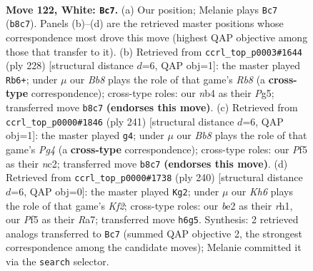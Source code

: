 \documentclass[11pt]{article}
\begin{document}
\clearpage

\begin{figure}[p]\centering
\begin{subfigure}{0.46\textwidth}\centering
\resizebox{\linewidth}{!}{%
\newchessgame
\chessboard[
  setfen={1B4k1/8/7K/5P2/1n6/8/4b3/8 w - - 1 122},
  showmover=false,
  pgfstyle=straightmove, color=movearrow, markmove={b8-c7}
]}
\caption{}
\end{subfigure}\hfill
\begin{subfigure}{0.46\textwidth}\centering
\resizebox{\linewidth}{!}{%
\newchessgame
\chessboard[
  setfen={1R6/5p2/3k4/6P1/4K3/2b5/8/8 w - - 83 115},
  showmover=false,
  pgfstyle=straightmove, color=movearrow, markmove={b8-b6}
]}
\caption{}
\end{subfigure}
\\[4pt]
\begin{subfigure}{0.46\textwidth}\centering
\resizebox{\linewidth}{!}{%
\newchessgame
\chessboard[
  setfen={8/8/b7/4n1p1/8/7k/2NN1K2/8 b - - 9 121},
  showmover=false,
  pgfstyle=straightmove, color=movearrow, markmove={g5-g4}
]}
\caption{}
\end{subfigure}\hfill
\begin{subfigure}{0.46\textwidth}\centering
\resizebox{\linewidth}{!}{%
\newchessgame
\chessboard[
  setfen={5B2/R7/8/5k2/2n5/8/5K2/7r w - - 14 121},
  showmover=false,
  pgfstyle=straightmove, color=movearrow, markmove={f2-g2}
]}
\caption{}
\end{subfigure}
\caption{\textbf{Move 122, White: \texttt{Bc7}.} (a) Our position; Melanie plays \texttt{Bc7} (\texttt{b8c7}). Panels (b)--(d) are the retrieved master positions whose correspondence most drove this move (highest QAP objective among those that transfer to it). (b) Retrieved from \texttt{ccrl\_top\_p0003\#1644} (ply 228) [structural distance $d$=6, QAP obj=1]: the master played \texttt{Rb6+}; under $\mu$ our \emph{Bb8} plays the role of that game's \emph{Rb8} (a \textbf{cross-type} correspondence); cross-type roles: our \emph{n}b4 as their \emph{P}g5; transferred move \texttt{b8c7} \textbf{(endorses this move)}. (c) Retrieved from \texttt{ccrl\_top\_p0000\#1846} (ply 241) [structural distance $d$=6, QAP obj=1]: the master played \texttt{g4}; under $\mu$ our \emph{Bb8} plays the role of that game's \emph{Pg4} (a \textbf{cross-type} correspondence); cross-type roles: our \emph{P}f5 as their \emph{n}c2; transferred move \texttt{b8c7} \textbf{(endorses this move)}. (d) Retrieved from \texttt{ccrl\_top\_p0000\#1738} (ply 240) [structural distance $d$=6, QAP obj=0]: the master played \texttt{Kg2}; under $\mu$ our \emph{Kh6} plays the role of that game's \emph{Kf2}; cross-type roles: our \emph{b}e2 as their \emph{r}h1, our \emph{P}f5 as their \emph{R}a7; transferred move \texttt{h6g5}. Synthesis: 2 retrieved analogs transferred to \texttt{Bc7} (summed QAP objective 2, the strongest correspondence among the candidate moves); Melanie committed it via the \texttt{search} selector.}
\label{fig:thought-m242}
\end{figure}
\end{document}
